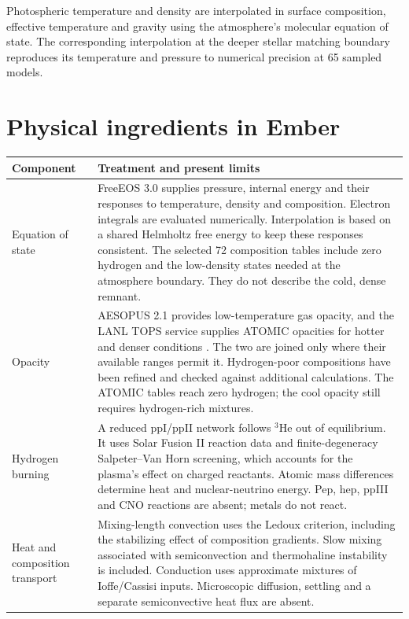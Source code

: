 \documentclass[11pt,letterpaper]{article}
\begin{document}
Photospheric temperature and density are interpolated in surface composition,
effective temperature and gravity using the atmosphere's molecular equation
of state. The corresponding interpolation at the deeper stellar matching
boundary reproduces its temperature and pressure to numerical precision at
65 sampled models.

\section{Physical ingredients in Ember}
\begin{longtable}{@{}>{\raggedright\arraybackslash}p{}>{\raggedright\arraybackslash}p{}@{}}
\toprule Component & Treatment and present limits \\\midrule\endhead
Equation of state & FreeEOS 3.0 supplies pressure, internal energy and their
responses to temperature, density and composition. Electron integrals are
evaluated numerically. Interpolation is based on a shared Helmholtz free energy
to keep these responses consistent. The selected
72 composition tables include zero hydrogen and the low-density states
needed at the atmosphere boundary. They do not describe the cold, dense remnant. \\[5pt]
Opacity & AESOPUS 2.1 provides low-temperature gas opacity, and the LANL TOPS
service supplies ATOMIC opacities for hotter and denser conditions
\cite{colgan16,tops}. The two are joined only where their
available ranges permit it. Hydrogen-poor compositions have been refined and
checked against additional calculations. The ATOMIC tables reach
zero hydrogen; the cool opacity still requires hydrogen-rich mixtures. \\[5pt]
Hydrogen burning & A reduced ppI/ppII network follows $^3$He out of equilibrium.
It uses Solar Fusion II reaction data and finite-degeneracy
Salpeter--Van Horn screening, which accounts for the plasma's effect on charged
reactants. Atomic mass differences determine heat and nuclear-neutrino energy.
Pep, hep, ppIII and CNO reactions are absent; metals do not react. \\[5pt]
Heat and composition transport & Mixing-length convection uses the Ledoux
criterion, including the stabilizing effect of composition gradients. Slow
mixing associated with semiconvection and thermohaline instability is included.
Conduction uses approximate mixtures of Ioffe/Cassisi inputs. Microscopic
diffusion, settling and a separate semiconvective heat flux are absent. \\[5pt]

\end{longtable}
\end{document}
